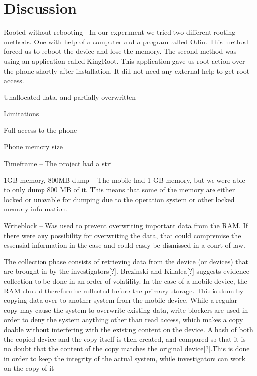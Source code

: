 \section{Discussion}
Rooted without rebooting - In our experiment we tried two different rooting methods. One with help of a computer and a program called Odin. This method forced us to reboot the device and lose the memory. The second method was using an application called KingRoot. This application gave us root action over the phone shortly after installation. It did not need any external help to get root access.

Unallocated data, and partially overwritten

Limitations

Full access to the phone

Phone memory size

Timeframe – The project had a stri

1GB memory, 800MB dump – The mobile had 1 GB memory, but we were able to only dump 800 MB of it. This means that some of the memory are either locked or unavable for dumping due to the operation system or other locked memory information.

Writeblock – Was used to prevent overwriting important data from the RAM. If there were any possibility for overwriting the data, that could compremise the essensial information in the case and could easly be dismissed in a court of law.

The collection phase consists of retrieving data from the device (or devices) that are brought in by the investigators[?]. Brezinski and Killalea[?] suggests evidence collection to be done in an order of volatility. In the case of a mobile device, the RAM should therefore be collected before the primary storage. This is done by copying data over to another system from the mobile device. While a regular copy may cause the system to overwrite existing data, write-blockers are used in order to deny the system anything other than read access, which makes a copy doable without interfering with the existing content on the device. A hash of both the copied device and the copy itself is then created, and compared so that it is no doubt that the content of the copy matches the original device[?].This is done in order to keep the integrity of the actual system, while investigators can work on the copy of it

